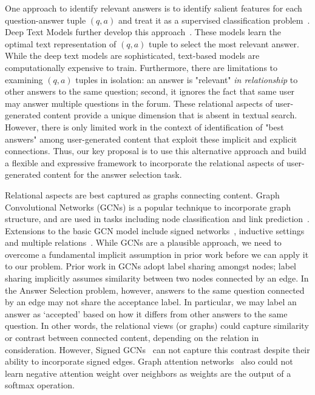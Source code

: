 One approach to identify relevant answers is to identify salient features for each question-answer tuple $(q,a)$ and treat it as a supervised classification problem~\citep{BurelMA16,  JendersKN16, TianZL13, TianL16}. Deep Text Models further develop this approach~\cite{ZhangLSW17, WuWS18, WangN15, SukhbaatarSWF15}. These models learn the optimal text representation of $(q,a)$ tuple to select the most relevant answer. While the deep text models are sophisticated, text-based models are computationally expensive to train. Furthermore, there are limitations to examining $(q,a)$ tuples in isolation: an answer is "relevant" \emph{in relationship} to other answers to the same question; second, it ignores the fact that same user may answer multiple questions in the forum.
These relational aspects of user-generated content provide a unique dimension that is absent in textual search. However, there is only limited work in the context of identification of "best answers" among user-generated content that exploit these implicit and explicit connections.
Thus, our key proposal is to use this alternative approach and build a flexible and expressive framework to incorporate the relational aspects of user-generated content for the answer selection task.

Relational aspects are best captured as graphs connecting content.
Graph Convolutional Networks (GCNs) is a popular technique to incorporate graph structure, and are used in tasks including node classification \cite{gcn} and link prediction~\cite{relationalGCN}. Extensions to the basic GCN model include signed networks~\cite{signedgcn}, inductive settings~\cite{graphsage} and multiple relations~\cite{DualGCN, relationalGCN}.
While GCNs are a plausible approach, we need to overcome a fundamental implicit assumption in prior work before we can apply it to our problem. Prior work in GCNs adopt label sharing amongst nodes; label sharing implicitly assumes similarity between two nodes connected by an edge. In the Answer Selection problem, however, answers to the same question connected by an edge may not share the acceptance label. In particular, we may label an answer as `accepted' based on how it differs from other answers to the same question.
In other words, the relational views (or graphs) could capture similarity or contrast between connected content, depending on the relation in consideration.
However, Signed GCNs~\cite{signedgcn} can not capture this contrast despite their ability to incorporate signed edges. Graph attention networks~\cite{graphattention} also could not learn negative attention weight over neighbors as weights are the output of a softmax operation.

